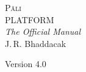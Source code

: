 \begin{titlepage}
\setcounter{page}{1}
{\noindent\fontsize{54pt}{54pt}\scshape Pāli}\\[0.5\baselineskip]
{\noindent\fontsize{28pt}{28pt}\upshape PLATFORM}\\[2\baselineskip]
{\huge\itshape The Official Manual}\\[5\baselineskip]
{\Large J.\,R. Bhaddacak}\par
{}
{\noindent\ttfamily Version 4.0}
\end{titlepage}
\endinput
